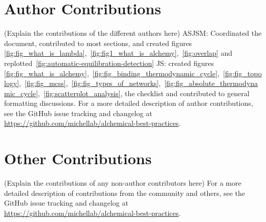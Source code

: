\documentclass[9pt,bestpractices]{livecoms}
\newcommand{\githubrepository}{\url{https://github.com/michellab/alchemical-best-practices}}  %
\begin{document}
\section*{Author Contributions}
%
(Explain the contributions of the different authors here)
ASJSM: Coordinated the document, contributed to most sections, and created figures \ref{fig:fig_what_is_lambda},~\ref{fig:fig1_what_is_alchemy},~\ref{fig:overlap} and replotted~\ref{fig:automatic-equilibration-detection} 
JS: created figures \ref{fig:fig_what_is_alchemy},~\ref{fig:fig_binding_thermodynamic_cycle},~\ref{fig:fig_topology},~\ref{fig:fig_mcss},~\ref{fig:fig_types_of_networks},~\ref{fig:fig_absolute_thermodynamic_cycle},~\ref{fig:scatterplot_analysis}, the checklist and contributed to general formatting discussions. 
For a more detailed description of author contributions,
see the GitHub issue tracking and changelog at \githubrepository.

\section*{Other Contributions}
%

(Explain the contributions of any non-author contributors here)
For a more detailed description of contributions from the community and others, see the GitHub issue tracking and changelog at \githubrepository.
\end{document}
